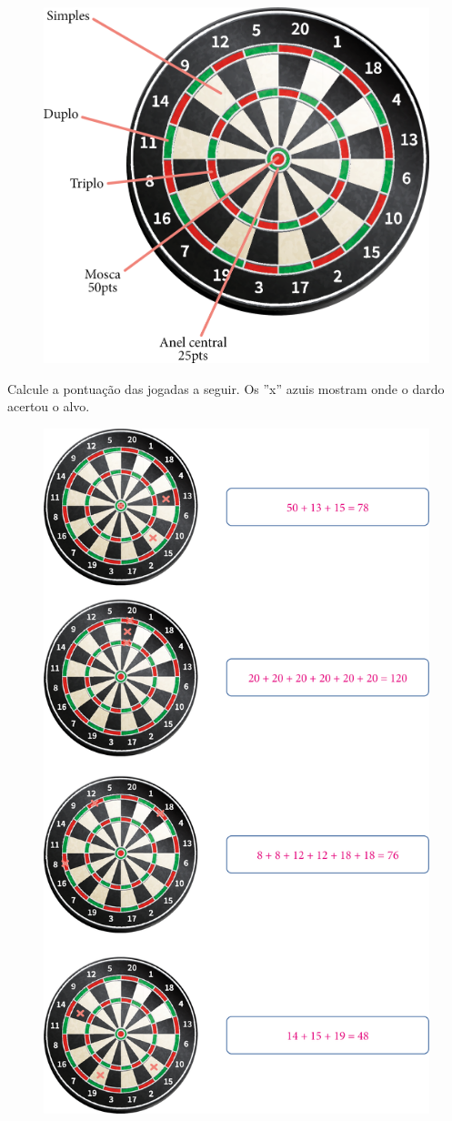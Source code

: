 \begin{figure}[htpb!]
\centering
\includegraphics[width=.6\textwidth]{./media/image24.png}
\end{figure}


\pagebreak
Calcule a pontuação das jogadas a seguir. Os ''x'' azuis mostram onde o dardo acertou o alvo.


\begin{figure}[htpb!]
\includegraphics[width=.7\textwidth]{./media/image25.png}
\end{figure}

